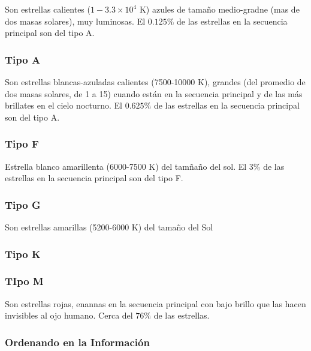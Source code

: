 Son estrellas calientes ($1-3.3 \times 10^4$ K) azules de tamaño medio-gradne (mas de dos masas solares), muy luminosas. El $0.125\%$ de las estrellas en la secuencia principal son del tipo A.

\subsubsection{Tipo A}

Son estrellas blancas-azuladas calientes (7500-10000 K), grandes (del promedio de dos masas solares, de 1 a 15) cuando están en la secuencia principal y de las más brillates en el cielo nocturno.  El $0.625\%$ de las estrellas en la secuencia principal son del tipo A.

\subsubsection{Tipo F}

Estrella blanco amarillenta (6000-7500 K) del tamñaño del sol. El $3\%$ de las estrellas en la secuencia principal son del tipo F. 

\subsubsection{Tipo G}

Son estrellas amarillas (5200-6000 K) del tamaño del Sol 

\subsubsection{Tipo K}

\subsubsection{TIpo M}

Son estrellas rojas, enannas en la secuencia principal con bajo brillo que las hacen invisibles al ojo humano. Cerca del $76\%$ de las estrellas. 

\subsubsection{Ordenando en la Información}


